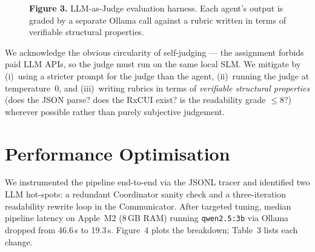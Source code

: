 \documentclass[11pt]{article}
\begin{document}
\begin{figure}[h]
\centering
{}
\caption*{\small\textbf{Figure 3.} LLM-as-Judge evaluation harness. Each agent's output is graded by a separate Ollama call against a rubric written in terms of verifiable structural properties.}
\end{figure}

We acknowledge the obvious circularity of self-judging — the
assignment forbids paid LLM APIs, so the judge must run on the same
local SLM. We mitigate by (i)~using a stricter prompt for the judge
than the agent, (ii)~running the judge at temperature~0, and
(iii)~writing rubrics in terms of \emph{verifiable structural
properties} (does the JSON parse? does the RxCUI exist? is the
readability grade $\le 8$?) wherever possible rather than purely
subjective judgement.

\section*{Performance Optimisation}\label{perf}

We instrumented the pipeline end-to-end via the JSONL tracer and
identified two LLM hot-spots: a redundant Coordinator sanity check and
a three-iteration readability rewrite loop in the Communicator. After
targeted tuning, median pipeline latency on Apple~M2 (8\,GB RAM)
running \texttt{qwen2.5:3b} via Ollama dropped from 46.6\,s to 19.3\,s.
Figure~4 plots the breakdown; Table~3 lists each change.
\end{document}
